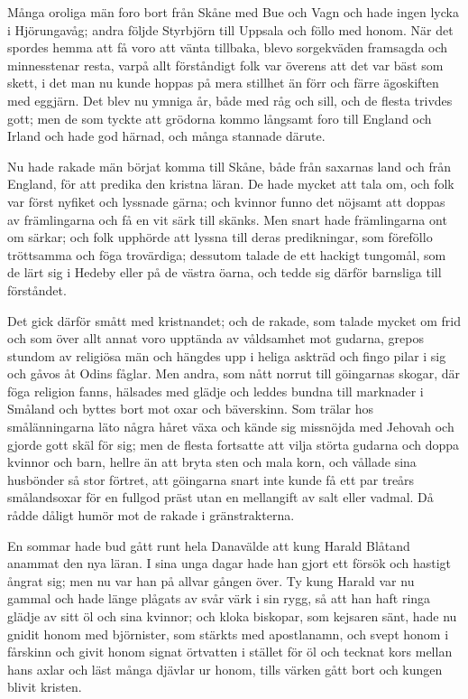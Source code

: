 %
%


\initial Många oroliga män foro bort från Skåne med Bue och Vagn och hade ingen lycka i Hjörungavåg; andra följde Styrbjörn till Uppsala och föllo med honom. När det spordes hemma att få voro att vänta tillbaka, blevo sorgekväden framsagda och minnesstenar resta, varpå allt förståndigt folk var överens att det var bäst som skett, i det man nu kunde hoppas på mera stillhet än förr och färre ägoskiften med eggjärn. Det blev nu ymniga år, både med råg och sill, och de flesta trivdes gott; men de som tyckte att grödorna kommo långsamt foro till England och Irland och hade god härnad, och många stannade därute.

\initial Nu hade rakade män börjat komma till Skåne, både från saxarnas land och från England, för att predika den kristna läran. De hade mycket att tala om, och folk var först nyfiket och lyssnade gärna; och kvinnor funno det nöjsamt att doppas av främlingarna och få en vit särk till skänks. Men snart hade främlingarna ont om särkar; och folk upphörde att lyssna till deras predikningar, som föreföllo tröttsamma och föga trovärdiga; dessutom talade de ett hackigt tungomål, som de lärt sig i Hedeby eller på de västra öarna, och tedde sig därför barnsliga till förståndet.

\initial Det gick därför smått med kristnandet; och de rakade, som talade mycket om frid och som över allt annat voro upptända av våldsamhet mot gudarna, grepos stundom av religiösa män och hängdes upp i heliga askträd och fingo pilar i sig och gåvos åt Odins fåglar. Men andra, som nått norrut till göingarnas skogar, där föga religion fanns, hälsades med glädje och leddes bundna till marknader i Småland och byttes bort mot oxar och bäverskinn. Som trälar hos smålänningarna läto några håret växa och kände sig missnöjda med Jehovah och gjorde gott skäl för sig; men de flesta fortsatte att vilja störta gudarna och doppa kvinnor och barn, hellre än att bryta sten och mala korn, och vållade sina husbönder så stor förtret, att göingarna snart inte kunde få ett par treårs smålandsoxar för en fullgod präst utan en mellangift av salt eller vadmal. Då rådde dåligt humör mot de rakade i gränstrakterna.

\initial En sommar hade bud gått runt hela Danavälde att kung Harald Blåtand anammat den nya läran. I sina unga dagar hade han gjort ett försök och hastigt ångrat sig; men nu var han på allvar gången över. Ty kung Harald var nu gammal och hade länge plågats av svår värk i sin rygg, så att han haft ringa glädje av sitt öl och sina kvinnor; och kloka biskopar, som kejsaren sänt, hade nu gnidit honom med björnister, som stärkts med apostlanamn, och svept honom i fårskinn och givit honom signat örtvatten i stället för öl och tecknat kors mellan hans axlar och läst många djävlar ur honom, tills värken gått bort och kungen blivit kristen.

